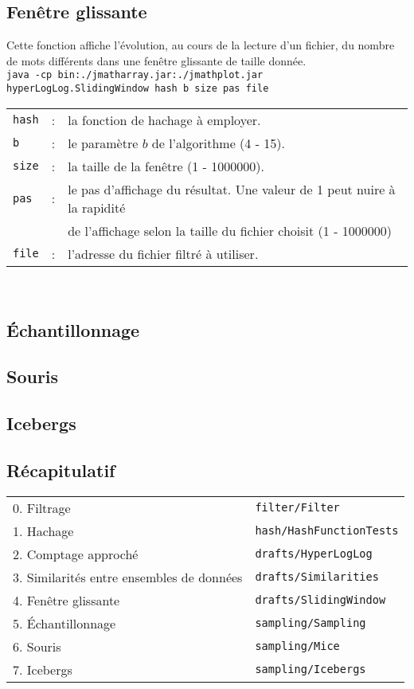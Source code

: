 \documentclass[12pt,a4paper,titlepage]{article}
\newcommand{\code}[1]{ \texttt{\footnotesize #1} }
\begin{document}
\subsection{Fenêtre glissante}
Cette fonction affiche l'évolution, au cours de la lecture d'un fichier, du nombre de mots différents dans une fenêtre glissante de taille donnée. \\
\code{java -cp bin:./jmatharray.jar:./jmathplot.jar hyperLogLog.SlidingWindow hash b size pas file}\\
\begin{tabular}{lcl}
\code{hash} &:& la fonction de hachage à employer.\\
\code{b} &:& le paramètre $b$ de l'algorithme (4 - 15).\\
\code{size} &:& la taille de la fenêtre (1 - 1000000).\\
\code{pas}&:& le pas d'affichage du résultat. Une valeur de 1 peut nuire à la rapidité\\
&& de l'affichage selon la taille du fichier choisit (1 - 1000000)\\
\code{file} &:& l'adresse du fichier filtré à utiliser.
\end{tabular}\\


\subsection{Échantillonnage}




\subsection{Souris}

\subsection{Icebergs}

\subsection{Récapitulatif}
\begin{center} \begin{tabular}{ll}
0. Filtrage 		 & \code{filter/Filter} \\
1. Hachage 			 & \code{hash/HashFunctionTests} \\
2. Comptage approché & \code{drafts/HyperLogLog} \\
3. Similarités entre ensembles de données & \code{drafts/Similarities} \\
4. Fenêtre glissante & \code{drafts/SlidingWindow} \\
5. Échantillonnage 	 & \code{sampling/Sampling} \\
6. Souris 			 & \code{sampling/Mice} \\
7. Icebergs 		 & \code{sampling/Icebergs}
\end{tabular} \end{center}
\end{document}
